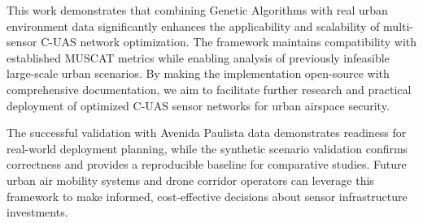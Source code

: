 This work demonstrates that combining Genetic Algorithms with real urban environment data significantly enhances the applicability and scalability of multi-sensor C-UAS network optimization. The framework maintains compatibility with established MUSCAT metrics while enabling analysis of previously infeasible large-scale urban scenarios. By making the implementation open-source with comprehensive documentation, we aim to facilitate further research and practical deployment of optimized C-UAS sensor networks for urban airspace security.

The successful validation with Avenida Paulista data demonstrates readiness for real-world deployment planning, while the synthetic scenario validation confirms correctness and provides a reproducible baseline for comparative studies. Future urban air mobility systems and drone corridor operators can leverage this framework to make informed, cost-effective decisions about sensor infrastructure investments.


